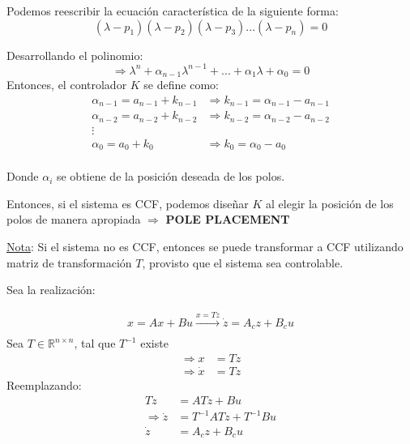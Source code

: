 Podemos reescribir la ecuación característica de la siguiente forma:
$$(\lambda-p_1)(\lambda-p_2)(\lambda-p_3)...(\lambda-p_n)=0 $$

Desarrollando el polinomio:
$$\Longrightarrow \lambda^n+\alpha_{n-1}\lambda^{n-1}+...+\alpha_1\lambda+\alpha_0=0 $$
Entonces, el controlador $K$ se define como:
\begin{align*}
    \alpha_{n-1} = a_{n-1}+k_{n-1} &\Longrightarrow k_{n-1} = \alpha_{n-1}-a_{n-1}\\
    \alpha_{n-2} = a_{n-2}+k_{n-2} &\Longrightarrow k_{n-2} = \alpha_{n-2}-a_{n-2}\\
    \vdots \\
    \alpha_0 = a_0+k_0 &\Longrightarrow k_0 = \alpha_0-a_0\\
\end{align*}

Donde $\alpha_i$ se obtiene de la posición deseada de los polos. \\

\par Entonces, si el sistema es CCF, podemos diseñar $K$ al elegir la posición de los polos de manera apropiada $\Longrightarrow$ \textbf{POLE PLACEMENT}\\

\par \underline{Nota}: Si el sistema no es CCF, entonces se puede transformar a CCF utilizando matriz de transformación ${T}$, provisto que el sistema sea controlable.\\

\par Sea la realización:

\begin{align*}
    {x}=Ax+Bu \xrightarrow[]{x=Tz} \dot{z}=A_cz+B_cu
\end{align*}
Sea $T \in \mathbb{R}^{n\times n}$, tal que $T^{-1}$ existe
\begin{align*}
    \Longrightarrow x&=Tz\\
    \Longrightarrow \dot{x}&=T\dot{z}
\end{align*}
Reemplazando:
\begin{align*}
    T\dot{z} &= ATz+Bu\\
    \Longrightarrow \dot{z}&=T^{-1}ATz+T^{-1}Bu\\
    \dot{z} &= A_cz+B_cu
\end{align*}

